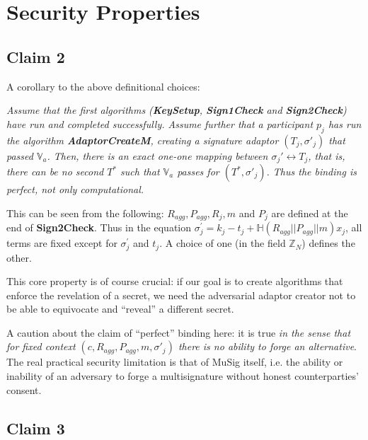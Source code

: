 \documentclass[10pt,a4paper]{article}
\begin{document}
\section{Security Properties}

\subsection{Claim 2}

A corollary to the above definitional choices:

\vspace{5 pt}

\emph{Assume that the first algorithms (\textbf{KeySetup}, \textbf{Sign1Check} and \textbf{Sign2Check}) have run and completed successfully. Assume further that a participant $p_j$ has run the algorithm \textbf{AdaptorCreateM}, creating a signature adaptor $(T_j, \sigma'_j)$ that passed $\mathbb{V}_a$. Then, there is an exact one-one mapping between $\sigma_j' \leftrightarrow T_j$, that is, there can be no second $T^{*}$ such that $\mathbb{V}_a$ passes for $(T^{*}, \sigma'_j)$. Thus the binding is perfect, not only computational.}

\vspace{10 pt}

This can be seen from the following: $R_{agg},P_{agg}, R_j, m$ and $P_j$ are defined at the end of \textbf{Sign2Check}. Thus in the equation $\sigma_j^{'} = k_j - t_j + \mathbb{H}(R_{agg}||P_{agg}||m)x_j$, all terms are fixed except for $\sigma_j^{'}$ and $t_j$. A choice of one (in the field $\mathbb{Z}_N$) defines the other.

\vspace{5 pt}

This core property is of course crucial: if our goal is to create algorithms that enforce the revelation of a secret, we need the adversarial adaptor creator not to be able to equivocate and ``reveal'' a different secret.

\vspace{5 pt}

A caution about the claim of ``perfect'' binding here: it is true \emph{in the sense that for fixed context $(c, R_{agg}, P_{agg}, m, \sigma'_j)$ there is no ability to forge an alternative}. The real practical security limitation is that of MuSig itself, i.e. the ability or inability of an adversary to forge a multisignature without honest counterparties' consent.

\subsection{Claim 3}
\end{document}
